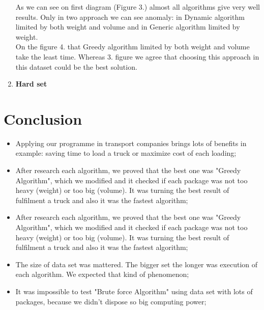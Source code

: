 \documentclass[conference,compsoc]{IEEEtran}
\begin{document}
\begin{enumerate}
As we can see on first diagram (Figure 3.) almost all algorithms give very well results. Only in two approach we can see anomaly: in Dynamic algorithm limited by both weight and volume and in Generic algorithm limited by weight.\\

On the figure 4. that Greedy algorithm limited by both weight and volume take the least time. Whereas 3. figure we agree that choosing this approach in this dataset could be the best solution.\\

\item \textbf{Hard set}




\end{enumerate}





\section{Conclusion}
\begin{itemize}
\item Applying our programme in transport companies brings lots of benefits in example: saving time to load a truck or maximize cost of each loading;

\item After research each algorithm, we proved that the best one was "Greedy Algorithm", which we modified and it checked if each package was not too heavy (weight) or too big (volume). It was turning the best result of fulfilment a truck and also it was the fastest algorithm;

\item After research each algorithm, we proved that the best one was "Greedy Algorithm", which we modified and it checked if each package was not too heavy (weight) or too big (volume). It was turning the best result of fulfilment a truck and also it was the fastest algorithm;

\item The size of data set was mattered. The bigger set the longer was execution of each algorithm. We expected that kind of phenomenon;

\item It was impossible to test "Brute force Algorithm" using data set with lots of packages, because we didn't dispose so big computing power;

\end{itemize}
\end{document}
